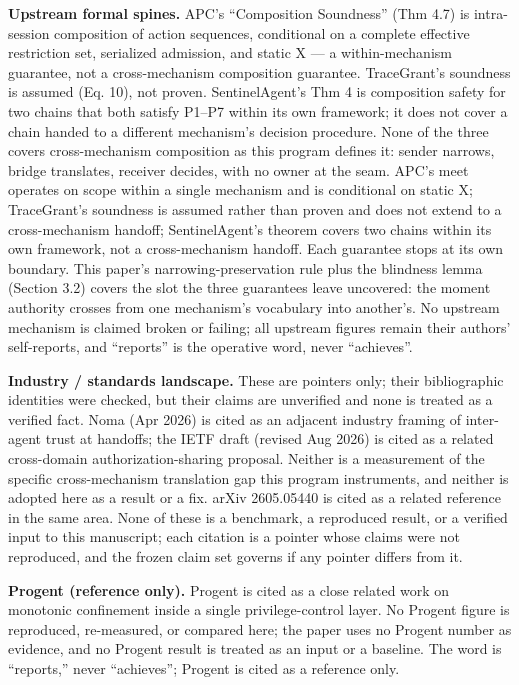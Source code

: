 \documentclass[
  10pt,
]{article}
\newcounter{none} %
\renewcommand{\_}{\origunderscore\allowbreak}
\begin{document}
\textbf{Upstream formal spines.} APC's ``Composition Soundness'' (Thm
4.7) is intra-session composition of action sequences, conditional on a
complete effective restriction set, serialized admission, and static X
--- a within-mechanism guarantee, not a cross-mechanism composition
guarantee. TraceGrant's soundness is assumed (Eq. 10), not proven.
SentinelAgent's Thm 4 is composition safety for two chains that both
satisfy P1--P7 within its own framework; it does not cover a chain
handed to a different mechanism's decision procedure. None of the three
covers cross-mechanism composition as this program defines it: sender
narrows, bridge translates, receiver decides, with no owner at the seam.
APC's meet operates on scope within a single mechanism and is
conditional on static X; TraceGrant's soundness is assumed rather than
proven and does not extend to a cross-mechanism handoff; SentinelAgent's
theorem covers two chains within its own framework, not a
cross-mechanism handoff. Each guarantee stops at its own boundary. This
paper's narrowing-preservation rule plus the blindness lemma (Section
3.2) covers the slot the three guarantees leave uncovered: the moment
authority crosses from one mechanism's vocabulary into another's. No
upstream mechanism is claimed broken or failing; all upstream figures
remain their authors' self-reports, and ``reports'' is the operative
word, never ``achieves''.

\textbf{Industry / standards landscape.} These are pointers only; their
bibliographic identities were checked, but their claims are unverified
and none is treated as a verified fact. Noma (Apr 2026) is cited as an
adjacent industry framing of inter-agent trust at handoffs; the IETF
draft (revised Aug 2026) is cited as a related cross-domain
authorization-sharing proposal. Neither is a measurement of the specific
cross-mechanism translation gap this program instruments, and neither is
adopted here as a result or a fix. arXiv 2605.05440 is cited as a
related reference in the same area. None of these is a benchmark, a
reproduced result, or a verified input to this manuscript; each citation
is a pointer whose claims were not reproduced, and the frozen claim set
governs if any pointer differs from it.

\textbf{Progent (reference only).} Progent is cited as a close related
work on monotonic confinement inside a single privilege-control layer.
No Progent figure is reproduced, re-measured, or compared here; the
paper uses no Progent number as evidence, and no Progent result is
treated as an input or a baseline. The word is ``reports,'' never
``achieves''; Progent is cited as a reference only.
\end{document}

